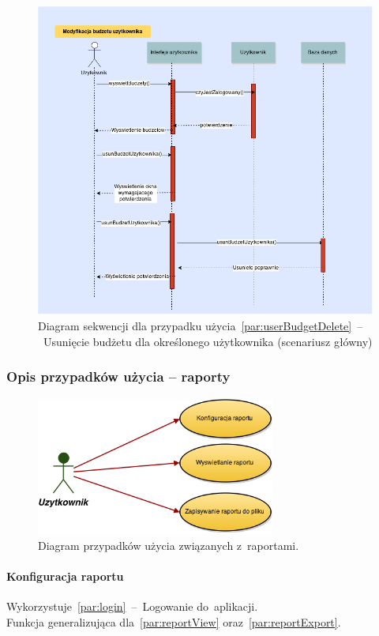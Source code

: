 \begin{figure}[H]
  \includegraphics[width=\textwidth]{images/usun_budzet_uzytkownika.png}
  \caption{Diagram sekwencji dla przypadku użycia~\ref{par:userBudgetDelete}~--~Usunięcie budżetu dla określonego użytkownika (scenariusz główny)}
\end{figure}

\subsubsection{Opis przypadków użycia -- raporty}

\begin{figure}[H]
  \centering
  \includegraphics[width=0.7\textwidth]{images/raport_usecases.png}
  \caption{Diagram przypadków użycia związanych z~raportami.}
\end{figure}

\paragraph{Konfiguracja raportu\newline}
\label{par:reportConfig}
Wykorzystuje~\ref{par:login}~--~Logowanie do~aplikacji.\\
\indent Funkcja generalizująca dla~\ref{par:reportView} oraz~\ref{par:reportExport}.\\

